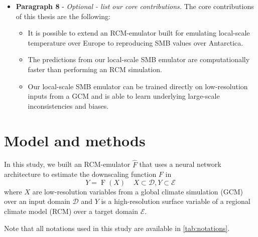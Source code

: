 \documentclass[a4paper,11pt,oneside]{report}
\begin{document}
\begin{itemize}
    \item \textbf{Paragraph 8} - \textit{Optional - list our core contributions.}
    The core contributions of this thesis are the following: 
    \begin{itemize}
        \item It is possible to extend an RCM-emulator built for emulating local-scale temperature over Europe to reproducing SMB values over Antarctica.
        \item The predictions from our local-scale SMB emulator are computationally faster than performing an RCM simulation. 
        \item Our local-scale SMB emulator can be trained directly on low-resolution inputs from a GCM and is able to learn underlying large-scale inconsistencies and biases.
    \end{itemize}

\end{itemize}





\chapter{Model and methods}

In this study, we built an RCM-emulator $\hat{F}$ that uses a neural network architecture to estimate the downscaling function $F$ in 
\begin{equation}\label{eq:emulator-equation}
    Y = \operatorname{F}(X) \;\;\;\; X\subset\mathcal{D}, Y\subset\mathcal{E}
    \end{equation}
where $X$ are low-resolution variables from a global climate simulation (GCM) over an input domain $\mathcal{D}$ and $Y$ is a high-resolution surface variable of a regional climate model (RCM) over a target domain $\mathcal{E}$. 

Note that all notations used in this study are available in \autoref{tab:notations}. 

\end{document}

